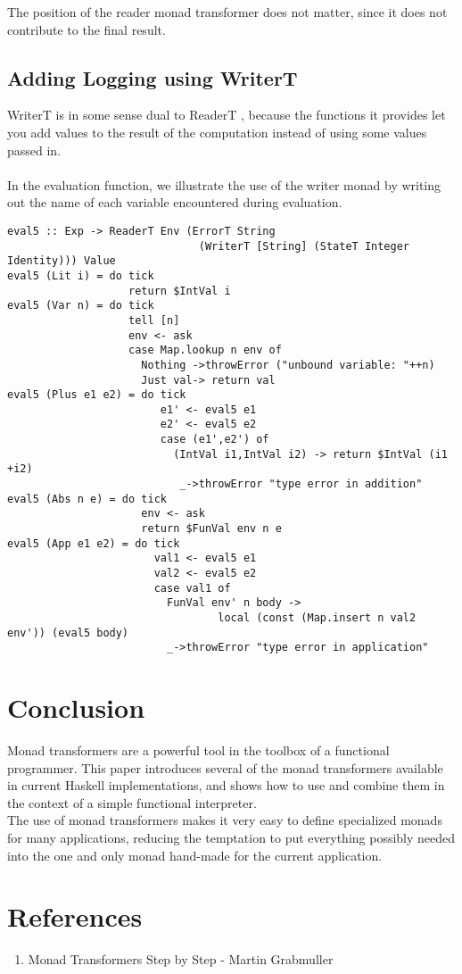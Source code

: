 \documentclass[a4paper,10pt]{article}
\begin{document}
The position of the reader monad transformer does not matter, since it does not contribute to the final result.

\subsection{Adding Logging using WriterT}
WriterT is in some sense dual to ReaderT , because the functions it provides let you add values to the result
of the computation instead of using some values passed in.\\\\

In the evaluation function, we illustrate the use of the writer monad by writing out the name of
each variable encountered during evaluation.

\begin{verbatim}
eval5 :: Exp -> ReaderT Env (ErrorT String 
                              (WriterT [String] (StateT Integer Identity))) Value
eval5 (Lit i) = do tick
                   return $IntVal i 
eval5 (Var n) = do tick
                   tell [n]
                   env <- ask
                   case Map.lookup n env of 
                     Nothing ->throwError ("unbound variable: "++n) 
                     Just val-> return val
eval5 (Plus e1 e2) = do tick
                        e1' <- eval5 e1
                        e2' <- eval5 e2
                        case (e1',e2') of 
                          (IntVal i1,IntVal i2) -> return $IntVal (i1 +i2) 
                           _->throwError "type error in addition"
eval5 (Abs n e) = do tick
                     env <- ask 
                     return $FunVal env n e 
eval5 (App e1 e2) = do tick
                       val1 <- eval5 e1
                       val2 <- eval5 e2
                       case val1 of
                         FunVal env' n body ->
                                 local (const (Map.insert n val2 env')) (eval5 body)
                         _->throwError "type error in application" 
\end{verbatim}


\newpage
\section{Conclusion}
Monad transformers are a powerful tool in the toolbox of a functional programmer. This paper
introduces several of the monad transformers available in current Haskell implementations, and
shows how to use and combine them in the context of a simple functional interpreter.\\
The use of monad transformers makes it very easy to define specialized monads for many
applications, reducing the temptation to put everything possibly needed into the one and only
monad hand-made for the current application.

\section{References}
\begin{enumerate}
 \item Monad Transformers Step by Step - Martin Grabmuller
\end{enumerate}
\end{document}
